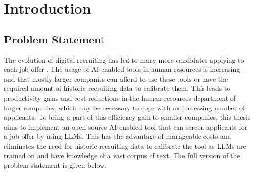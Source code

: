 \documentclass[draft,final]{thesisclass} %
\begin{document}
\mainmatter

\chapter{Introduction} \label{introduction}

\section{Problem Statement} \label{problem_statement}
The evolution of digital recruiting has led to many more candidates applying to each job offer \parencite[4]{ai_recruiting}.
The usage of \acs{AI}-enabled tools in human resources is increasing and that mostly larger companies can afford to use these tools or have the required amount of historic recruiting data to calibrate them.
This leads to productivity gains and cost reductions in the human resources department of larger companies, which may be necessary to cope with an increasing number of applicants.
To bring a part of this efficiency gain to smaller companies, this thesis aims to implement an open-source \acs{AI}-enabled tool that can screen applicants for a job offer by using \gls{LLM}s.
This has the advantage of manageable costs and eliminates the need for historic recruiting data to calibrate the tool as \gls{LLM}s are trained on and have knowledge of a vast corpus of text.
The full version of the problem statement is given below.
\end{document}
